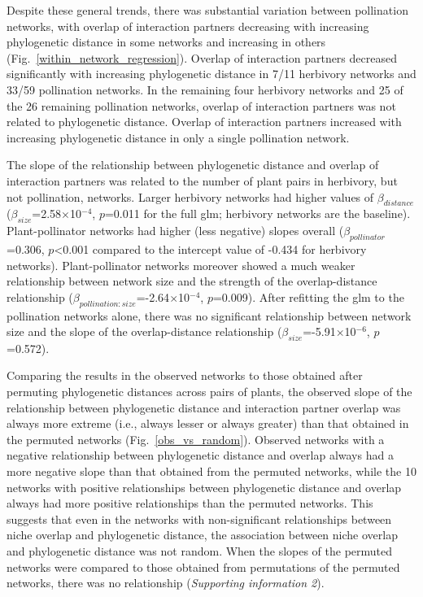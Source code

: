 \documentclass[12pt]{article}
\begin{document}
\begin{spacing}{1.5}
    Despite these general trends, there was substantial variation between 
    pollination networks, with overlap of interaction partners decreasing 
    with increasing phylogenetic distance in some networks and increasing 
    in others (Fig.~\ref{within_network_regression}). Overlap of 
    interaction partners decreased significantly with increasing 
    phylogenetic distance in 7/11 herbivory networks and 33/59 
    pollination networks. In the remaining four herbivory networks and 
    25 of the 26 remaining pollination networks, overlap of interaction 
    partners was not related to phylogenetic distance. Overlap of 
    interaction partners increased with increasing phylogenetic distance 
    in only a single pollination network.%


    The slope of the relationship between phylogenetic distance and 
    overlap of interaction partners was related to the number of plant pairs 
    in herbivory, but not pollination, networks. Larger herbivory networks 
    had higher values of $\beta_{distance}$ 
    ($\beta_{size}$=2.58$\times$10$^{-4}$, $p$=0.011 for the full glm; 
    herbivory networks are the baseline). Plant-pollinator networks had 
    higher (less negative) slopes overall ($\beta_{pollinator}$=0.306, 
    $p$\textless0.001 compared to the intercept value of -0.434 for 
    herbivory networks). Plant-pollinator networks moreover showed a 
    much weaker relationship between network size and the strength of the 
    overlap-distance relationship 
    ($\beta_{pollination:size}$=-2.64$\times$10$^{-4}$, $p$=0.009). 
    After refitting the glm to the pollination networks alone, there was 
    no significant relationship between network size and the slope of 
    the overlap-distance relationship ($\beta_{size}$=-5.91$\times$10$^{-6}$, 
    $p$=0.572).


    Comparing the results in the observed networks to those obtained after 
    permuting phylogenetic distances across pairs of plants, the observed 
    slope of the relationship between phylogenetic distance and interaction 
    partner overlap was always more extreme (i.e., always lesser or always 
    greater) than that obtained in the permuted networks (Fig.~\ref{obs_vs_random}).
    Observed networks with a negative relationship between phylogenetic distance 
    and overlap always had a more negative slope than that obtained from the 
    permuted networks, while the 10 networks with positive relationships 
    between phylogenetic distance and overlap always had more positive 
    relationships than the permuted networks. This suggests that even in 
    the networks with non-significant relationships between niche overlap 
    and phylogenetic distance, the association between niche overlap and 
    phylogenetic distance was not random. When the slopes of the permuted 
    networks were compared to those obtained from permutations of the 
    permuted networks, there was no relationship (\emph{Supporting 
    information 2}).



\end{spacing}
\end{document}
